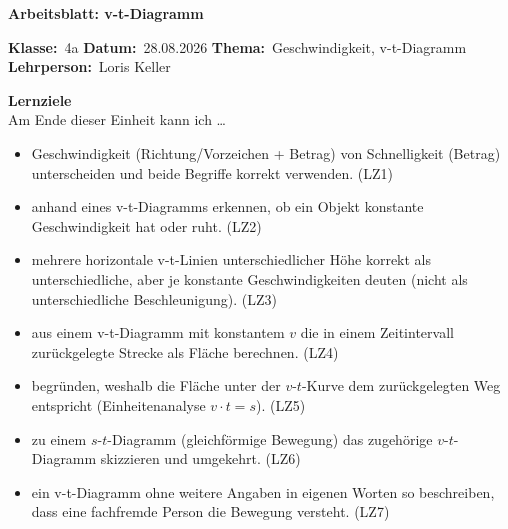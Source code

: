 \documentclass[addpoints,11pt,a4paper]{exam}
\newcommand{\Kopfzeile}[4]{%
  \begin{titlebox}
    {\color{white}\sffamily\bfseries\Large #4}
  \end{titlebox}
  \vspace{0.5em}
  \noindent\textbf{Klasse:}~#1 \hfill \textbf{Datum:}~#2 \hfill \textbf{Thema:}~#3
    \hfill \textbf{Lehrperson:}~Loris Keller
  \vspace{0.8em}
  \lhead{\textcolor{darkgray}{#3}}
  \rhead{\textcolor{darkgray}{#4}}
}
\newcommand{\Klasse}{4a}
\newcommand{\Datum}{28.08.2026}
\newcommand{\Thema}{Geschwindigkeit, v-t-Diagramm}
\newcommand{\ArbeitsblattTitel}{Arbeitsblatt: v-t-Diagramm}
\begin{document}
\Kopfzeile{\Klasse}{\Datum}{\Thema}{\ArbeitsblattTitel}

\begin{infobox}
\textbf{Lernziele}\\
Am Ende dieser Einheit kann ich \dots
\begin{itemize}[leftmargin=1.2cm,itemsep=0.25em]
  \item Geschwindigkeit (Richtung/Vorzeichen + Betrag) von Schnelligkeit (Betrag) unterscheiden und beide Begriffe korrekt verwenden. (LZ1)
  \item anhand eines v-t-Diagramms erkennen, ob ein Objekt konstante Geschwindigkeit hat oder ruht. (LZ2)
  \item mehrere horizontale v-t-Linien unterschiedlicher Höhe korrekt als unterschiedliche, aber je konstante Geschwindigkeiten deuten (nicht als unterschiedliche Beschleunigung). (LZ3)
  \item aus einem v-t-Diagramm mit konstantem $v$ die in einem Zeitintervall zurückgelegte Strecke als Fläche berechnen. (LZ4)
  \item begründen, weshalb die Fläche unter der $v$-$t$-Kurve dem zurückgelegten Weg entspricht (Einheitenanalyse $v\cdot t = s$). (LZ5)
  \item zu einem $s$-$t$-Diagramm (gleichförmige Bewegung) das zugehörige $v$-$t$-Diagramm skizzieren und umgekehrt. (LZ6)
  \item ein v-t-Diagramm ohne weitere Angaben in eigenen Worten so beschreiben, dass eine fachfremde Person die Bewegung versteht. (LZ7)
\end{itemize}
\end{infobox}
\end{document}
